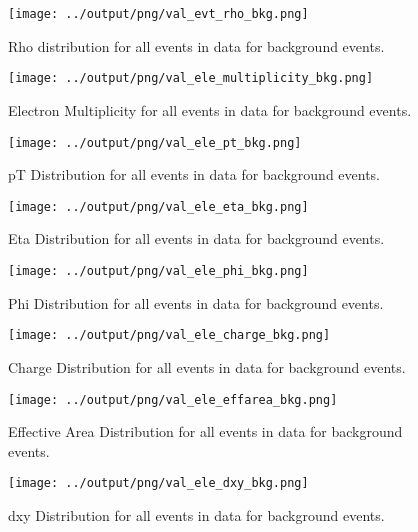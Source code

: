 \documentclass[11pt]{book}
\begin{document}
\begin{figure}[htb]
\centering
\texttt{[image: ../output/png/val\_evt\_rho\_bkg.png]}
\caption{Rho distribution for all events in data for background events.}
\label{fig:val_evt_rho_bkg}
\end{figure}

\begin{figure}[htb]
\centering
\texttt{[image: ../output/png/val\_ele\_multiplicity\_bkg.png]}
\caption{Electron Multiplicity for all events in data for background events.}
\label{fig:val_ele_multiplicity_bkg}
\end{figure}

\begin{figure}[htb]
\centering
\texttt{[image: ../output/png/val\_ele\_pt\_bkg.png]}
\caption{pT Distribution for all events in data for background events.}
\label{fig:val_ele_pt_bkg}
\end{figure}

\begin{figure}[htb]
\centering
\texttt{[image: ../output/png/val\_ele\_eta\_bkg.png]}
\caption{Eta Distribution for all events in data for background events.}
\label{fig:val_ele_eta_bkg}
\end{figure}

\begin{figure}[htb]
\centering
\texttt{[image: ../output/png/val\_ele\_phi\_bkg.png]}
\caption{Phi Distribution for all events in data for background events.}
\label{fig:val_ele_phi_bkg}
\end{figure}

\begin{figure}[htb]
\centering
\texttt{[image: ../output/png/val\_ele\_charge\_bkg.png]}
\caption{Charge Distribution for all events in data for background events.}
\label{fig:val_ele_charge_bkg}
\end{figure}

\begin{figure}[htb]
\centering
\texttt{[image: ../output/png/val\_ele\_effarea\_bkg.png]}
\caption{Effective Area Distribution for all events in data for background events.}
\label{fig:val_ele_effarea_bkg}
\end{figure}

\begin{figure}[htb]
\centering
\texttt{[image: ../output/png/val\_ele\_dxy\_bkg.png]}
\caption{dxy Distribution for all events in data for background events.}
\label{fig:val_ele_dxy_bkg}
\end{figure}
\end{document}
